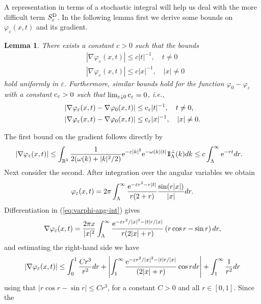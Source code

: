 \documentclass[11pt]{article}
\newtheorem{lemma}[theorem]{Lemma}
\def\bbbone{{\mathchoice {\rm 1\mskip-4mu l} {\rm 1\mskip-4mu l}
{\rm 1\mskip-4.5mu l} {\rm 1\mskip-5mu l}}}
\def\one{\bbbone}
\newcommand{\kp}{\one_\Lambda^\perp(k)}
\providecommand{\eq}[1]{\begin{equation}\label{#1}}
\providecommand{\en}{\end{equation}}
\providecommand{\BR}{{\mathbb{R}^3 }}
\providecommand{\dd}{{\rm D}}
\providecommand{\lk}{\left(}
\providecommand{\rk}{\right)}
\providecommand{\La}{{\Lambda}}
\providecommand{\e}{{\rm e}}
\providecommand{\1}{\mathbb{1}}
\providecommand{\dd}{\mathop{\mathrm{d}}\nolimits}
\providecommand{\eps}{\varepsilon}
\providecommand{\ce}{{\rm c}_\eps}
\newcounter {constant}
\begin{document}
A representation in terms of a stochastic integral will help us deal with the more difficult term
$S_\eps^{\dd }$. In the following lemma first we derive some bounds on $\varphi_\eps(x,t)$ and its
gradient.
\begin{lemma}
\label{lpb}
There exists a constant $c>0$ such that the bounds
\begin{align*}
&
|\nabla \varphi_\eps(x,t)|\le c  |t|^{-1},\quad t\not=0  \\
&
|\nabla \varphi_\eps(x,t)| \le c |x|^{-1},\quad |x|\not=0
\end{align*}
hold uniformly in $\eps$. Furthermore, similar bounds hold for the function $\varphi_0-\varphi_\eps$
with a constant $\ce   > 0$ such that $\lim_{\eps\downarrow 0}\ce  =0$, i.e.,
\begin{align*}
&
|\nabla \varphi_\eps(x,t)-\nabla \varphi_0(x,t) |\le \ce    |t|^{-1},\quad t\not=0,  \\
&
|\nabla \varphi_\eps(x,t)-\nabla \varphi_0(x,t) | \le \ce   |x|^{-1},\quad |x|\not=0.
\end{align*}\end{lemma}
\proof
The first bound on the gradient follows directly by
\begin{equation*}
\begin{split}
|\nabla \varphi_\eps(x,t)| & \le
\int_{\BR} \frac{1}{2 (\omega(k)+|k|^2/2)} \e^{-\eps |k|^2} \e^{-\omega(k)|t|}\kp dk
\le c \int_\La^\infty  \e^{ -r t} dr.
\end{split}
\end{equation*}
Next consider the second. After integration over the angular variables we obtain
\eq{eq:varphi-ang-int}
\varphi_\eps(x,t) = 2\pi \int_{\Lambda}^\infty \frac{\e^{-\eps r^2 - r |t|}}{r(2+r)} \frac{\sin(r|x|)}{|x|} dr.
\en
Differentiation in (\ref{eq:varphi-ang-int}) gives
\begin{equation}
\label{b}
\nabla \varphi_\eps(x,t)
= \frac{2\pi x}{|x|^2} \int_{\Lambda}^\infty  \frac{\e^{-\eps r^2/|x|^{2}-|t| r/|x|}}{r(2|x|+r)}
\lk r\cos r -\sin r \rk dr,
\end{equation}
and estimating the right-hand  side we have
\begin{align*}
|\nabla \varphi_\eps(x,t)|
 \leq \int_{0}^{1}  \frac{C r^3}{r^2} dr
+ \left|\int_{1}^\infty   \frac{\e^{-\eps r^2/|x|^{2}-|t|r/|x|}}{(2|x|+r)} \cos r dr\right|
+ \int_{1}^\infty  \frac{1}{r^2}dr
\end{align*}using that $|r\cos r  - \sin r | \le C r^3$, for a constant $C > 0$ and all $r\in [0,1]$. Since the
\end{document}
